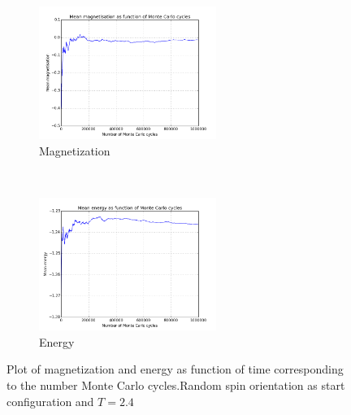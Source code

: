 \documentclass{article}
\begin{document}
\begin{figure}[t!]
    \centering
    \begin{subfigure}[t]{0.6\textwidth}
        \centering
        \includegraphics[height=1.7in]{4cmagnetisationrandom24.png}
        \caption{Magnetization}
    \end{subfigure}%
    ~ 
    \begin{subfigure}[t]{0.6\textwidth}
        \centering
        \includegraphics[height=1.7in]{4cenergyrandom24.png}
        \caption{Energy}
    \end{subfigure}
    \caption{Plot of magnetization and energy as function of time corresponding to the number Monte Carlo cycles.Random spin orientation as start configuration and $T = 2.4$}
\end{figure}
\end{document}
